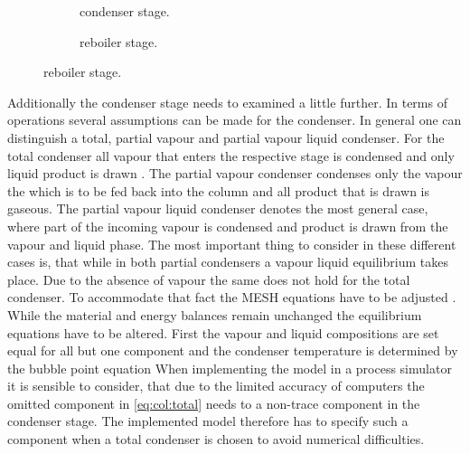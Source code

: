         \begin{figure}
            \centering
            \begin{subfigure}{0.45\textwidth}
                \centering
                
                \caption{condenser stage.}
                \label{fig:col_condenser}
            \end{subfigure}
            \begin{subfigure}{0.45\textwidth}
                \centering
                
                \caption{reboiler stage.}
                \label{fig:col_reboiler}
            \end{subfigure}
        \end{figure}

        Additionally the condenser stage needs to examined a little further. In terms of operations
        several assumptions can be made for the condenser. In general one can distinguish a total,
        partial vapour and partial vapour liquid condenser. For the total condenser all vapour that
        enters the respective stage is condensed and only liquid product is drawn . The partial vapour
        condenser condenses only the vapour the which is to be fed back into
        the column and all product that is drawn is gaseous. The partial vapour liquid condenser
        denotes the most general case, where part of the incoming vapour is condensed and product
        is drawn from the vapour and liquid phase. The most important thing to consider in these 
        different cases is, that while in both partial condensers a vapour liquid equilibrium takes 
        place. Due to the absence of vapour the same does not hold for the total condenser. To accommodate 
        that fact the MESH equations have to be adjusted \cite{Naphtali.1971}. While the material and energy
        balances remain unchanged the equilibrium equations have to be altered. First the vapour and
        liquid compositions are set equal for all but one component
        and the condenser temperature is determined by the bubble point equation
        When implementing the model in a process simulator it is sensible to consider, that due to
        the limited accuracy of computers the omitted component in \eqref{eq:col:total} needs to
        a non-trace component in the condenser stage. The implemented model therefore has to specify
        such a component when a total condenser is chosen to avoid numerical difficulties.

